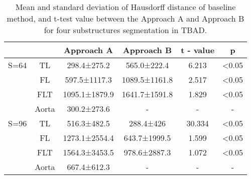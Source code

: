 \documentclass{article}
\begin{document}
\begin{table}[]
\centering
\caption{
Mean and standard deviation of Hausdorff distance of baseline method, and t-test value between the Approach A and Approach B for four substructures segmentation in TBAD.
}

\begin{tabular}{@{}cccccc@{}}
\toprule
        &       & Approach A & Approach B     & t - value & p          \\ \midrule
S=64    & TL    & 298.4±275.2	  & 565.0±222.4	   & 6.213     & \textless{}0.05\\
        & FL    & 597.5±1117.3   & 1089.5±1161.8	   & 2.517     & \textless{}0.05\\
        & FLT   & 1095.1±1879.9  & 1641.7±1591.8     & 1.829     & \textless{}0.05\\
        & Aorta & 300.2±273.6   &      -      & -     & -  \\
S=96    & TL    & 516.3±482.5   & 288.4±426      & 30.334     & \textless{}0.05\\
        & FL    & 1273.1±2554.4  & 643.7±1999.5	   & 1.599     & \textless{}0.05\\
        & FLT   & 1564.3±3453.5  & 978.6±2887.3     & 1.072      & \textless{}0.05\\
        & Aorta & 667.4±612.3   &     -     & -    & -  \\ \bottomrule
\end{tabular}
\label{table:results-hd}
\end{table}
\end{document}
